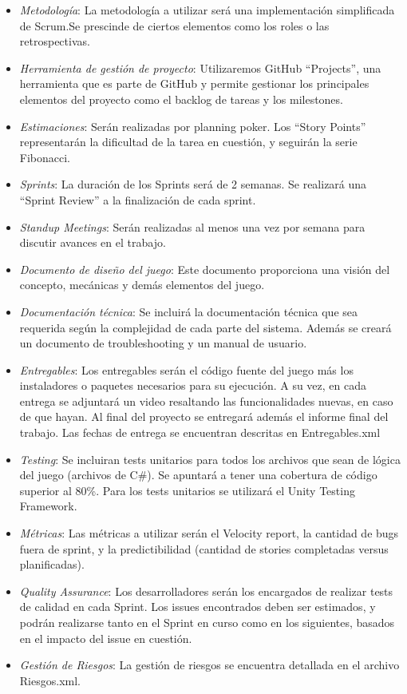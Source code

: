 \documentclass{article}
\begin{document}
\begin{itemize}
    \item \textit{Metodología}: La metodología a utilizar será una implementación simplificada de Scrum.Se prescinde de ciertos elementos como los roles o las retrospectivas.
    \item \textit{Herramienta de gestión de proyecto}: Utilizaremos GitHub “Projects”, una herramienta que es parte de GitHub y permite gestionar los principales elementos del proyecto como el backlog de tareas y los milestones.
    \item \textit{Estimaciones}: Serán realizadas por planning poker. Los “Story Points” representarán la dificultad de la tarea en cuestión, y seguirán la serie Fibonacci.
    \item \textit{Sprints}: La duración de los Sprints será de 2 semanas. Se realizará una “Sprint Review” a la finalización de cada sprint.
    \item \textit{Standup Meetings}: Serán realizadas al menos una vez por semana para discutir avances en el trabajo.
    \item \textit{Documento de diseño del juego}: Este documento proporciona una visión del concepto, mecánicas y demás elementos del juego.
    \item \textit{Documentación técnica}: Se incluirá la documentación técnica que sea requerida según la complejidad de cada parte del sistema. Además se creará un documento de troubleshooting y un manual de usuario.
    \item \textit{Entregables}: Los entregables serán el código fuente del juego más los instaladores o paquetes necesarios para su ejecución. A su vez, en cada entrega se adjuntará un video resaltando las funcionalidades nuevas, en caso de que hayan. Al final del proyecto se entregará además el informe final del trabajo. Las fechas de entrega se encuentran descritas en Entregables.xml
    \item \textit{Testing}: Se incluiran tests unitarios para todos los archivos que sean de lógica del juego (archivos de C\#). Se apuntará a tener una cobertura de código superior al 80\%. Para los tests unitarios se utilizará el Unity Testing Framework.
    \item \textit{Métricas}: Las métricas a utilizar serán el Velocity report, la cantidad de bugs fuera de sprint, y la predictibilidad (cantidad de stories completadas versus planificadas).
    \item \textit{Quality Assurance}: Los desarrolladores serán los encargados de realizar tests de calidad en cada Sprint. Los issues encontrados deben ser estimados, y podrán realizarse tanto en el Sprint en curso como en los siguientes, basados en el impacto del issue en cuestión.
    \item \textit{Gestión de Riesgos}: La gestión de riesgos se encuentra detallada en el archivo Riesgos.xml.
\end{itemize}



\end{document}
